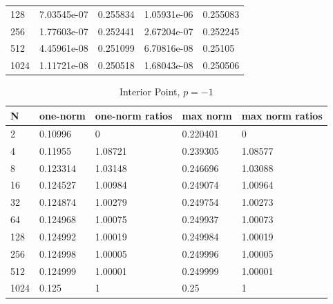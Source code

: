 \documentclass{article} %
\theoremstyle{plain}
\numberwithin{equation}{section} %
\numberwithin{figure}{section} %
\numberwithin{table}{section} %
\begin{document}
\begin{enumerate}[\ \ (a)]
\begin{table}
\begin{tabular}[ht!]{lllll}
                  128 & 7.03545e-07 &         0.255834  & 1.05931e-06 &          0.255083 \\
                  256 & 1.77603e-07 &         0.252441  & 2.67204e-07 &          0.252245 \\
                  512 & 4.45961e-08 &         0.251099  & 6.70816e-08 &          0.25105  \\
                 1024 & 1.11721e-08 &         0.250518  & 1.68043e-08 &          0.250506 \\
                \hline
            \end{tabular}
        \end{table}
        \begin{table}
            \centering
            \caption{Interior Point, $p=-1$}
            \begin{tabular}[ht!]{lllll}
                \hline
                    N &   one-norm &   one-norm ratios &   max norm &   max norm ratios \\
                \hline
                    2 &   0.10996  &           0       &   0.220401 &           0       \\
                    4 &   0.11955  &           1.08721 &   0.239305 &           1.08577 \\
                    8 &   0.123314 &           1.03148 &   0.246696 &           1.03088 \\
                   16 &   0.124527 &           1.00984 &   0.249074 &           1.00964 \\
                   32 &   0.124874 &           1.00279 &   0.249754 &           1.00273 \\
                   64 &   0.124968 &           1.00075 &   0.249937 &           1.00073 \\
                  128 &   0.124992 &           1.00019 &   0.249984 &           1.00019 \\
                  256 &   0.124998 &           1.00005 &   0.249996 &           1.00005 \\
                  512 &   0.124999 &           1.00001 &   0.249999 &           1.00001 \\
                 1024 &   0.125    &           1       &   0.25     &           1       \\
                \hline
            \end{tabular}
        \end{table}
        \begin{table}
            \centering

\end{table}
\end{enumerate}
\end{document}
